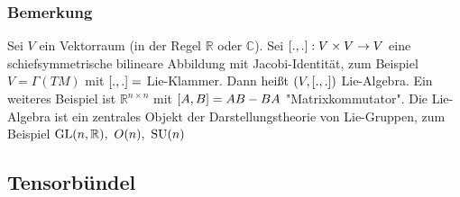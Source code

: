 \subsubsection{Bemerkung}
\label{ssub:169}
Sei $V$ ein Vektorraum (in der Regel $\mathds{R}$ oder $\mathds{C}$). Sei $[.,.]:V\times V \to V$ eine schiefsymmetrische bilineare Abbildung mit Jacobi-Identität, zum Beispiel $V = \Gamma(TM)$ mit $[.,.] = $ Lie-Klammer. Dann heißt $(V,[.,.])$ Lie-Algebra. Ein weiteres Beispiel ist $\mathds{R}^{n\times n}$ mit $[A,B] = AB-BA$ "Matrixkommutator". Die Lie-Algebra ist ein zentrales Objekt der Darstellungstheorie von Lie-Gruppen, zum Beispiel $\operatorname{GL}(n,\mathbb{R}),\ O(n),\ \operatorname{SU}(n)$


\subsection{Tensorbündel}
\label{sub:110}

